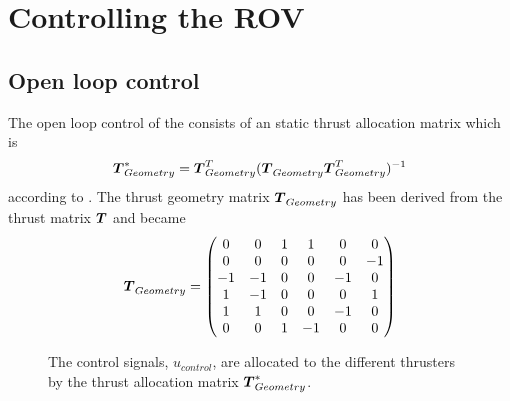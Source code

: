 \chapter{Controlling the ROV} \label{cha:controller}

\section{Open loop control}
The open loop control of the \abbrROV consists of an static thrust allocation matrix which is
\begin{equation}
    \thrusterGeometryOnes[*] = \thrusterGeometryOnes[T](\thrusterGeometryOnes \thrusterGeometryOnes[T])^{-1}
\end{equation}
according to \citet{thrustallocation}. The thrust geometry matrix $\thrusterGeometryOnes$ has been derived from the thrust matrix $\thrusterGeometry$ and became 
\begin{equation*}
    \thrusterGeometryOnes = 
    \begin{pmatrix}
    0  & 0  & 1 & 1  &  0 &  0 \\
    0  & 0  & 0 & 0  &  0 & -1 \\
    -1 & -1 & 0 & 0  & -1 &  0 \\
    1  & -1 & 0 & 0  &  0 &  1 \\
    1  & 1  & 0 & 0  & -1 &  0 \\
    0  & 0  & 1 & -1 &  0 &  0 \\
    \end{pmatrix}
\end{equation*}


\begin{figure}
    \centering

    \caption{The control signals, $u_{control}$, are allocated to the different thrusters by the thrust allocation matrix $\thrusterGeometryOnes[*]$.} 
    \label{fig:open_control}
\end{figure}

